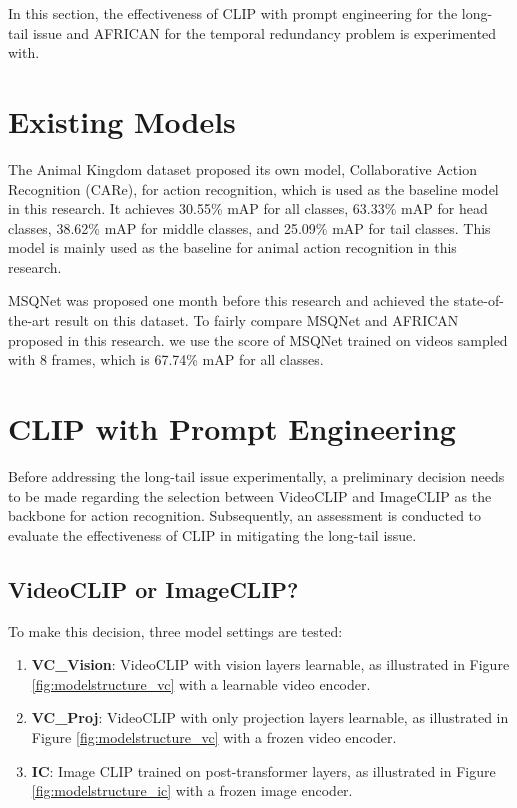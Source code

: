 In this section, the effectiveness of CLIP with prompt engineering for the long-tail issue and AFRICAN for the temporal redundancy problem is experimented with.

\section {Existing Models}
The Animal Kingdom dataset proposed its own model, Collaborative Action Recognition (CARe), for action recognition, which is used as the baseline model in this research. It achieves 30.55\% mAP for all classes, 63.33\% mAP for head classes, 38.62\% mAP for middle classes, and 25.09\% mAP for tail classes. This model is mainly used as the baseline for animal action recognition in this research.

MSQNet was proposed one month before this research and achieved the state-of-the-art result on this dataset. To fairly compare MSQNet \parencite{mondal2023msqnet} and AFRICAN proposed in this research. we use the score of MSQNet trained on videos sampled with 8 frames, which is 67.74\% mAP for all classes. 

\section{CLIP with Prompt Engineering}
Before addressing the long-tail issue experimentally, a preliminary decision needs to be made regarding the selection between VideoCLIP and ImageCLIP as the backbone for action recognition. Subsequently, an assessment is conducted to evaluate the effectiveness of CLIP in mitigating the long-tail issue.

\subsection{VideoCLIP or ImageCLIP?}
\label{sec:imageclipbetter}
To make this decision, three model settings are tested: 

\begin{enumerate}
    \item \textbf{VC\_Vision}: VideoCLIP with vision layers learnable, as illustrated in Figure \ref{fig:modelstructure_vc} with a learnable video encoder.
    \item \textbf{VC\_Proj}: VideoCLIP with only projection layers learnable, as illustrated in Figure \ref{fig:modelstructure_vc} with a frozen video encoder.
    \item \textbf{IC}: Image CLIP trained on post-transformer layers, as illustrated in Figure \ref{fig:modelstructure_ic} with a frozen image encoder.
\end{enumerate}

